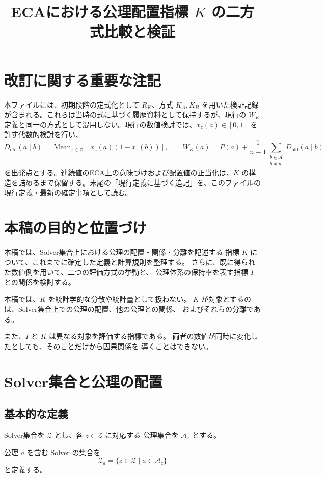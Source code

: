 \documentclass[a4paper,11pt]{ltjsarticle}
\title{ECAにおける公理配置指標 $K$ の二方式比較と検証}
\author{}
\date{}
\begin{document}
\maketitle

\section*{改訂に関する重要な注記}
本ファイルには、初期段階の定式化として $R_K$、方式 $K_A,K_B$ を用いた検証記録が含まれる。これらは当時の式に基づく履歴資料として保持するが、現行の $W_K$ 定義と同一の方式として混用しない。現行の数値検討では、$x_z(a)\in[0,1]$ を許す代数的検討を行い、
\[
D_{\mathrm{old}}(a\mid b)=\operatorname{Mean}_{z\in\mathcal Z}[x_z(a)(1-x_z(b))],\qquad
W_K(a)=P(a)+\frac{1}{n-1}\sum_{\substack{b\in\mathcal A\\b\ne a}}D_{\mathrm{old}}(a\mid b)
\]
を出発点とする。連続値のECA上の意味づけおよび配置値の正当化は、$K$ の構造を詰めるまで保留する。末尾の「現行定義に基づく追記」を、このファイルの現行定義・最新の確定事項として読む。


\section{本稿の目的と位置づけ}

本稿では、Solver集合上における公理の配置・関係・分離を記述する
指標 $K$ について、これまでに確定した定義と計算規則を整理する。
さらに、既に得られた数値例を用いて、二つの評価方式の挙動と、
公理体系の保持率を表す指標 $I$ との関係を検討する。

本稿では、$K$ を統計学的な分散や統計量として扱わない。
$K$ が対象とするのは、Solver集合上での公理の配置、他の公理との関係、
およびそれらの分離である。

また、$I$ と $K$ は異なる対象を評価する指標である。
両者の数値が同時に変化したとしても、そのことだけから因果関係を
導くことはできない。

\section{Solver集合と公理の配置}

\subsection{基本的な定義}

Solver集合を $\mathcal{Z}$ とし、各 $z\in\mathcal{Z}$ に対応する
公理集合を $\mathcal{A}_z$ とする。

公理 $a$ を含む Solver の集合を
\begin{equation}
  \mathcal{Z}_a
  =
  \{z\in\mathcal{Z}\mid a\in\mathcal{A}_z\}
\end{equation}
と定義する。
\end{document}
